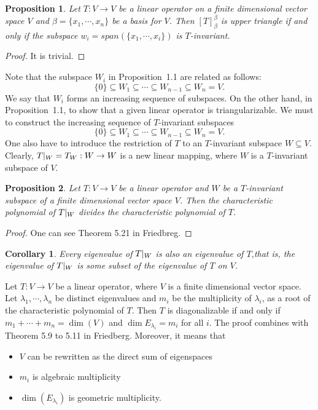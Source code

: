 \documentclass[12pt,reqno]{amsart}
\theoremstyle{plain}
\newcommand{\spanning}[1]{span(#1)}
\newtheorem{proposition}{Proposition}[section]
\newtheorem{corollary}{Corollary}[section]
\theoremstyle{remark}
\begin{document}
\begin{proposition}
	Let $T:V \rightarrow V$ be a linear operator on  a finite dimensional vector space $V$ and $\beta = \{x_1,\cdots,x_n\}$ be a basis for $V$. Then $[T]^{\beta}_{\beta}$ is upper triangle if and only if the subspace $w_i = \spanning{\{x_1,\cdots,x_i\}}$ is $T$-invariant.
\end{proposition}

\begin{proof}
	It is trivial.
\end{proof}

Note that the subspace $W_i$ in Proposition~1.1  are related as follows:
$$\{0\} \subseteq W_1 \subseteq \cdots \subseteq W_{n-1} \subseteq W_n = V.$$
We say that $W_i$ forms an increasing sequence of subspaces. On the other hand, in Proposition~1.1, to show that a given linear operator is triangularizable. We must to construct the increasing sequence of $T$-invariant subspaces 
$$\{0\} \subseteq W_1 \subseteq \cdots \subseteq W_{n-1} \subseteq W_n = V.$$
One also have to introduce  the restriction of $T$ to an $T$-invariant subspace $W \subseteq V$. Clearly, $T\arrowvert_W = T_W: W \rightarrow W$ is a new linear mapping, where $W$ is a $T$-invariant subspace of $V$.

\begin{proposition}
	Let $T:V \rightarrow V$ be a linear operator and $W$ be a $T$-invariant subspace of a finite dimensional vector space $V$. Then the characteristic polynomial of $T\arrowvert_W$ divides the characteristic polynomial of $T$.
\end{proposition}

\begin{proof}
	One can see Theorem 5.21 in Friedbreg.
\end{proof}

\begin{corollary}
	Every eigenvalue of $T\arrowvert_W$ is also an eigenvalue of $T$,that is, the eigenvalue of $T\arrowvert_W$ is some subset of the eigenvalue of $T$ on $V$.
\end{corollary}


Let $T:V \rightarrow V$ be a linear operator, where $V$ is a finite dimensional vector space. Let $\lambda_1,\cdots,\lambda_n$ be distinct eigenvalues and $m_i$ be the multiplicity of $\lambda_i$, as a root of the characteristic polynomial of $T$. Then $T$ is diagonalizable if and only if $m_1+\cdots+m_n = \dim(V)$ and $\dim{E_{\lambda_i}} = m_i$ for all $i$. The proof combines with Theorem 5.9 to 5.11 in Friedberg. Moreover, it means that 
\begin{itemize}
	\item [(1)] $V$ can be rewritten as the direct sum of eigenspaces
	\item [(2)] $m_i$ is algebraic multiplicity
	\item [(3)] $\dim(E_{\lambda_i})$ is geometric multiplicity.
\end{itemize}
\end{document}
